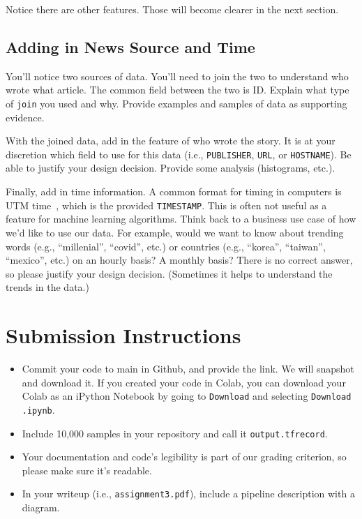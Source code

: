\documentclass[paper=a4, fontsize=11pt]{scrartcl} %
\begin{document}
Notice there are other features. Those will become clearer in the next section.

\subsection{Adding in News Source and Time}

You'll notice two sources of data. You'll need to join the two to understand who wrote what article. The common field between the two is ID. Explain what type of \verb"join" you used and why. Provide examples and samples of data as supporting evidence.

With the joined data, add in the feature of who wrote the story. It is at your discretion which field to use for this data (i.e., 
 \verb"PUBLISHER", \verb"URL", or \verb"HOSTNAME"). Be able to justify your design decision. Provide some analysis (histograms, etc.). 

 Finally, add in time information. A common format for timing in computers is UTM time~\cite{timestamp}, which is the provided \verb"TIMESTAMP". This is often not useful as a feature for machine learning algorithms. Think back to a business use case of how we'd like to use our data. For example, would we want to know about trending words (e.g., ``millenial'', ``covid'', etc.) or countries (e.g., ``korea'', ``taiwan'', ``mexico'', etc.) on an hourly basis? A monthly basis? There is no correct answer, so please justify your design decision. (Sometimes it helps to understand the trends in the data.)


\section{Submission Instructions}

\begin{itemize}
    \item Commit your code to main in Github, and provide the link. We will snapshot and download it. If you created your code in Colab, you can download your Colab as an iPython Notebook by going to \verb"Download" and selecting \verb"Download .ipynb". 
    \item Include 10,000 samples in your repository and call it \verb"output.tfrecord".
    \item Your documentation and code's legibility is part of our grading criterion, so please make sure it's readable.
    \item In your writeup (i.e., \verb"assignment3.pdf"), include a pipeline description with a diagram.
\end{itemize}
\end{document}
